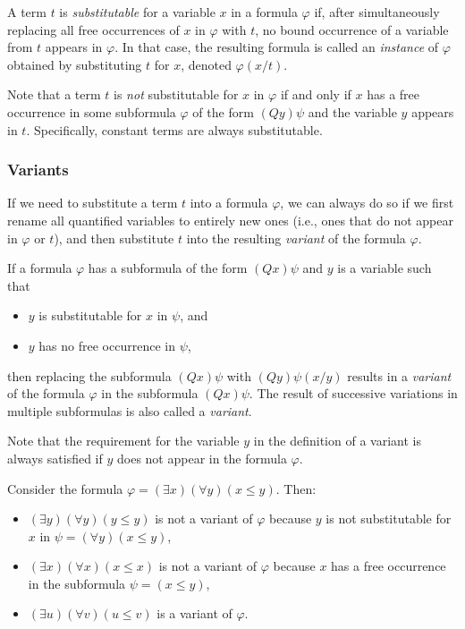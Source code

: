\begin{definition}
    A term $t$ is \emph{substitutable} for a variable $x$ in a formula $\varphi$ if, after simultaneously replacing all free occurrences of $x$ in $\varphi$ with $t$, no bound occurrence of a variable from $t$ appears in $\varphi$. In that case, the resulting formula is called an \emph{instance} of $\varphi$ obtained by substituting $t$ for $x$, denoted $\varphi(x/t)$.
\end{definition}

\begin{remark}
    Note that a term $t$ is \emph{not} substitutable for $x$ in $\varphi$ if and only if $x$ has a free occurrence in some subformula $\varphi$ of the form $(Qy)\psi$ and the variable $y$ appears in $t$. Specifically, constant terms are always substitutable.
\end{remark}


\subsubsection{Variants}

If we need to substitute a term $t$ into a formula $\varphi$, we can always do so if we first rename all quantified variables to entirely new ones (i.e., ones that do not appear in $\varphi$ or $t$), and then substitute $t$ into the resulting \emph{variant} of the formula $\varphi$.

\begin{definition}[Variant]
   If a formula $\varphi$ has a subformula of the form $(Qx)\psi$ and $y$ is a variable such that
   \begin{itemize}
    \item $y$ is substitutable for $x$ in $\psi$, and
    \item $y$ has no free occurrence in $\psi$,
   \end{itemize} 
then replacing the subformula $(Qx)\psi$ with $(Qy)\psi(x/y)$ results in a \emph{variant} of the formula $\varphi$ in the subformula $(Qx)\psi$. The result of successive variations in multiple subformulas is also called a \emph{variant}.
\end{definition}

Note that the requirement for the variable $y$ in the definition of a variant is always satisfied if $y$ does not appear in the formula $\varphi$.

\begin{example}
    Consider the formula $\varphi=(\exists x)(\forall y)(x\leq y)$. Then:
\begin{itemize}
    \item $(\exists y)(\forall y)(y\leq y)$ is not a variant of $\varphi$ because $y$ is not substitutable for $x$ in $\psi=(\forall y)(x\leq y)$,
    \item $(\exists x)(\forall x)(x\leq x)$ is not a variant of $\varphi$ because $x$ has a free occurrence in the subformula $\psi=(x\leq y)$,
    \item $(\exists u)(\forall v)(u\leq v)$ is a variant of $\varphi$.
\end{itemize}   
\end{example}

